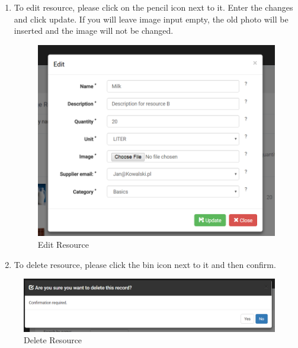 \documentclass[a4paper,11pt,twoside]{report}
\theoremstyle{definition}
\begin{document}
\begin{enumerate}
\begin{enumerate}
\item To edit resource, please click on the pencil icon next to it. Enter the changes and click update. 
If you will leave image input empty, the old photo will be inserted and the image will not be changed.

\begin{figure}[h!]
\begin{center}
\includegraphics[width=\textwidth]{AS/resources/4}
\end{center}
\caption{Edit Resource}
\end{figure}
\thispagestyle{empty}

\item To delete resource, please click the bin icon next to it and then confirm.
\end{enumerate}


\begin{figure}[h!]
\begin{center}
\includegraphics[width=\textwidth]{AS/resources/5}
\end{center}
\caption{Delete Resource}
\end{figure}
\thispagestyle{empty}


\end{enumerate}
\end{document}
